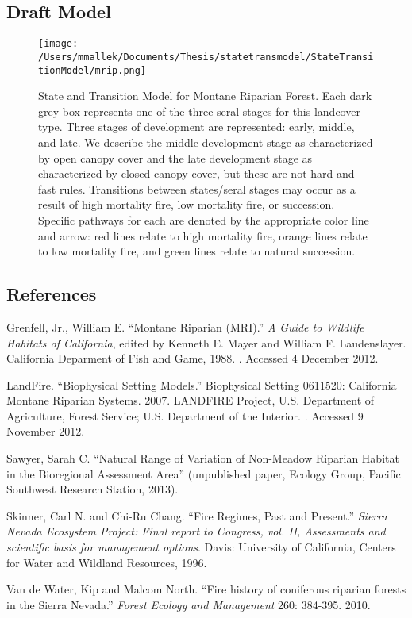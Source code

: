 \subsection{Draft Model}
\begin{figure}[htbp]
\centering
\texttt{[image: /Users/mmallek/Documents/Thesis/statetransmodel/StateTransitionModel/mrip.png]}
\caption{State and Transition Model for Montane Riparian Forest. Each dark grey box represents one of the three seral stages for this landcover type. Three stages of development are represented: early, middle, and late. We describe the middle development stage as characterized by open canopy cover and the late development stage as characterized by closed canopy cover, but these are not hard and fast rules. Transitions between states/seral stages may occur as a result of high mortality fire, low mortality fire, or succession. Specific pathways for each are denoted by the appropriate color line and arrow: red lines relate to high mortality fire, orange lines relate to low mortality fire, and green lines relate to natural succession.} 
\label{mrip_transmodel}
\end{figure}

\subsection*{References}
\begin{hangparas}{.25in}{1} 
Grenfell, Jr., William E. ``Montane Riparian (MRI).'' \emph{A Guide to Wildlife Habitats of California}, edited by Kenneth E. Mayer and William F. Laudenslayer. California Deparment of Fish and Game, 1988. . Accessed 4 December 2012.

LandFire. ``Biophysical Setting Models.'' Biophysical Setting 0611520: California Montane Riparian Systems. 2007. LANDFIRE Project, U.S. Department of Agriculture, Forest Service; U.S. Department of the Interior. . Accessed 9 November 2012.

Sawyer, Sarah C. ``Natural Range of Variation of Non-Meadow Riparian Habitat in the Bioregional Assessment Area'' (unpublished paper, Ecology Group, Pacific Southwest Research Station, 2013).

Skinner, Carl N. and Chi-Ru Chang. ``Fire Regimes, Past and Present.'' \emph{Sierra Nevada Ecosystem Project: Final report to Congress, vol. II, Assessments and scientific basis for management options}. Davis: University of California, Centers for Water and Wildland Resources, 1996.

Van de Water, Kip and Malcom North. ``Fire history of coniferous riparian forests in the Sierra Nevada.'' \emph{Forest Ecology and Management} 260: 384-395. 2010.

\end{hangparas}




